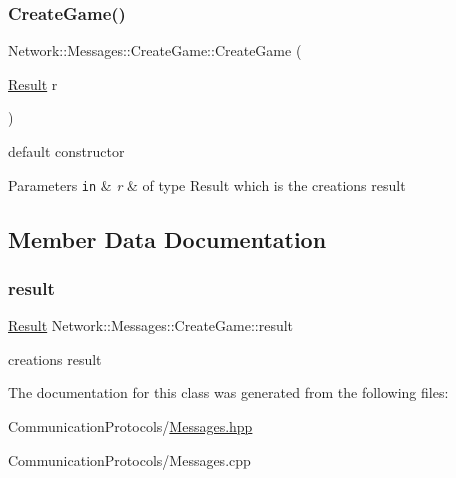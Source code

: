 \subsubsection{\texorpdfstring{Create\+Game()}{CreateGame()}}
{\footnotesize\ttfamily Network\+::\+Messages\+::\+Create\+Game\+::\+Create\+Game (\begin{DoxyParamCaption}\item[{\hyperlink{class_network_1_1_messages_1_1_base_a646d774928c7dfac987228f26ab5d46a}{Result}}]{r }\end{DoxyParamCaption})\hspace{0.3cm}{\ttfamily [inline]}}



default constructor 


\begin{DoxyParams}[1]{Parameters}
\mbox{\tt in}  & {\em r} & of type Result which is the creation\textquotesingle{}s result \\
\hline
\end{DoxyParams}


\subsection{Member Data Documentation}
\mbox{\label{class_network_1_1_messages_1_1_create_game_a8ad62ff6d3c12edc7c360ab041d2bf4f}} 
\subsubsection{\texorpdfstring{result}{result}}
{\footnotesize\ttfamily \hyperlink{class_network_1_1_messages_1_1_base_a646d774928c7dfac987228f26ab5d46a}{Result} Network\+::\+Messages\+::\+Create\+Game\+::result}

creation\textquotesingle{}s result 

The documentation for this class was generated from the following files\+:\begin{DoxyCompactItemize}
\item 
Communication\+Protocols/\hyperlink{_messages_8hpp}{Messages.\+hpp}\item 
Communication\+Protocols/Messages.\+cpp\end{DoxyCompactItemize}
